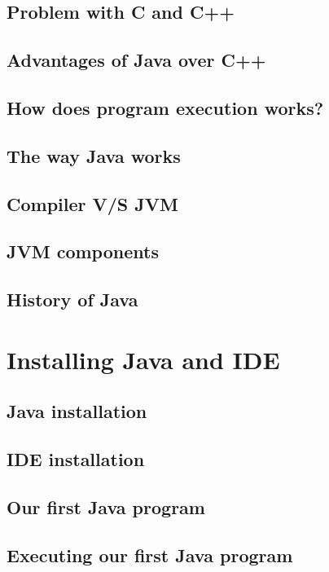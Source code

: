 \documentclass[14pt,fleqn]{extbook} %
\begin{document}
\subsection{Problem with C and C++}

\subsection{Advantages of Java over C++}

\subsection{How does program execution works?}

\subsection{The way Java works}

\subsection{Compiler V/S JVM}

\subsection{JVM components}

\subsection{History of Java}

\section{Installing Java and IDE}

\subsection{Java installation}

\subsection{IDE installation}

\subsection{Our first Java program}

\subsection{Executing our first Java program}

\end{document}
